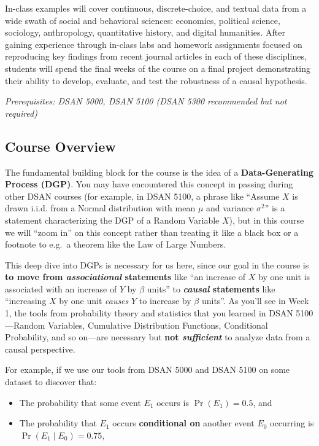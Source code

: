\documentclass[
]{scrartcl}
\providecommand{\tightlist}{%
  \setlength{\itemsep}{0pt}\setlength{\parskip}{0pt}}\usepackage{longtable,booktabs,array}
\begin{document}
In-class examples will cover continuous, discrete-choice, and textual
data from a wide swath of social and behavioral sciences: economics,
political science, sociology, anthropology, quantitative history, and
digital humanities. After gaining experience through in-class labs and
homework assignments focused on reproducing key findings from recent
journal articles in each of these disciplines, students will spend the
final weeks of the course on a final project demonstrating their ability
to develop, evaluate, and test the robustness of a causal hypothesis.

\emph{Prerequisites: DSAN 5000, DSAN 5100 (DSAN 5300 recommended but not
required)}

\subsection{Course Overview}\label{course-overview}

The fundamental building block for the course is the idea of a
\textbf{Data-Generating Process (DGP)}. You may have encountered this
concept in passing during other DSAN courses (for example, in DSAN 5100,
a phrase like ``Assume \(X\) is drawn i.i.d. from a Normal distribution
with mean \(\mu\) and variance \(\sigma^2\)'' is a statement
characterizing the DGP of a Random Variable \(X\)), but in this course
we will ``zoom in'' on this concept rather than treating it like a black
box or a footnote to e.g.~a theorem like the Law of Large Numbers.

This deep dive into DGPs is necessary for us here, since our goal in the
course is \textbf{to move from \emph{associational} statements} like
``an increase of \(X\) by one unit is associated with an increase of
\(Y\) by \(\beta\) units'' to \textbf{\emph{causal} statements} like
``increasing \(X\) by one unit \emph{causes} \(Y\) to increase by
\(\beta\) units''. As you'll see in Week 1, the tools from probability
theory and statistics that you learned in DSAN 5100---Random Variables,
Cumulative Distribution Functions, Conditional Probability, and so
on---are necessary but \textbf{not \emph{sufficient}} to analyze data
from a causal perspective.

For example, if we use our tools from DSAN 5000 and DSAN 5100 on some
dataset to discover that:

\begin{itemize}
\tightlist
\item
  The probability that some event \(E_1\) occurs is \(\Pr(E_1) = 0.5\),
  and
\item
  The probability that \(E_1\) occurs \textbf{conditional on} another
  event \(E_0\) occurring is \(\Pr(E_1 \mid E_0) = 0.75\),
\end{itemize}
\end{document}
